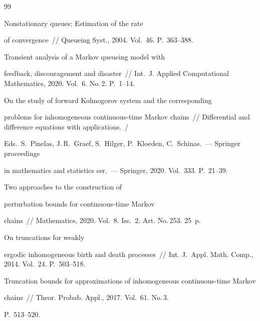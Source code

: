 {{\begin{thebibliography}{99}

 Nonstationary queues: Estimation of the rate 

of convergence~/\!\!/ Queueing Syst., 2004. Vol.~46. P.~363--388.




  Transient analysis of a Markov queueing model with 

feedback, discouragement and disaster~/\!\!/ Int.~J. Applied Computational Mathematics, 2020. Vol.~6. No.\,2. P.~1--14.

    


 On the study of forward Kolmogorov system and the corresponding 

problems for inhomogeneous continuous-time Markov chains~/\!\!/ Differential and difference equations with applications.~/

 Eds.\ S.~Pinelas, J.\,R.~Graef, S.~Hilger, P.~Kloeden, C.~Schinas.~--- Springer proceedings 

in mathematics and statistics ser.~--- Springer, 2020. Vol.~333. P.~21--39.  




 Two approaches to the construction of 

perturbation bounds for continuous-time Markov

chains~/\!\!/ Mathematics, 2020. Vol.~8. Iss.~2. Art. No.\,253. 25~p.






 On truncations for weakly 

ergodic inhomogeneous birth and death processes~/\!\!/  Int. J.~Appl. Math. Comp., 2014. Vol.~24. P.~503--518.





Truncation bounds for approximations of inhomogeneous continuous-time Markov 

chains~/\!\!/ Theor. Probab. Appl., 2017. Vol.~61. No.\,3. 

P.~513--520.

 \end{thebibliography}

} }







